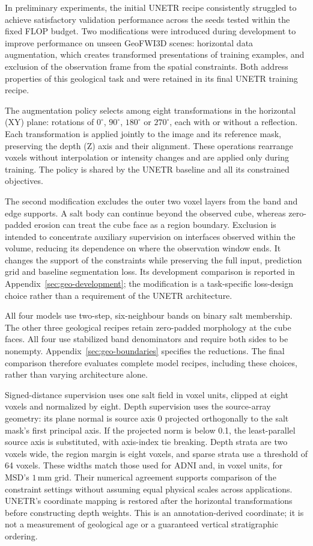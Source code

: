 \documentclass[12pt,a4paper]{article}
\begin{document}
In preliminary experiments, the initial UNETR recipe consistently struggled
to achieve satisfactory validation performance across the seeds tested
within the fixed FLOP budget. Two modifications were introduced during
development to improve performance on unseen GeoFWI3D scenes: horizontal
data augmentation, which creates transformed presentations of training
examples, and exclusion of the observation frame from the spatial
constraints. Both address properties of this geological task and were
retained in its final UNETR training recipe.

The augmentation policy selects among eight transformations in the
horizontal (XY) plane: rotations of $0^\circ$, $90^\circ$, $180^\circ$
or $270^\circ$, each with or without a reflection. Each transformation
is applied jointly to the image and its reference mask, preserving the
depth (Z) axis and their alignment. These operations rearrange voxels
without interpolation or intensity changes and are applied only during
training. The policy is shared by the UNETR baseline and all its
constrained objectives.

The second modification excludes the outer two voxel layers from the
band and edge supports. A salt body can continue beyond the observed
cube, whereas zero-padded erosion can treat the cube face as a region
boundary. Exclusion is intended to concentrate auxiliary supervision
on interfaces observed within the volume, reducing its dependence on
where the observation window ends. It changes the support of the
constraints while preserving the full input, prediction grid and
baseline segmentation loss. Its development comparison is reported in
Appendix~\ref{sec:geo-development}; the modification is a task-specific
loss-design choice rather than a requirement of the UNETR architecture.

All four models use two-step, six-neighbour bands on binary salt
membership. The other three geological recipes retain zero-padded
morphology at the cube faces. All four use stabilized band denominators
and require both sides to be nonempty.
Appendix~\ref{sec:geo-boundaries} specifies the reductions. The final
comparison therefore evaluates complete model recipes, including these
choices, rather than varying architecture alone.

Signed-distance supervision uses one salt field in voxel units, clipped
at eight voxels and normalized by eight. Depth supervision uses the
source-array geometry: its plane normal is source axis 0 projected
orthogonally to the salt mask's first principal axis. If the projected
norm is below 0.1, the least-parallel source axis is substituted, with
axis-index tie breaking. Depth strata are two voxels wide, the region
margin is eight voxels, and sparse strata use a threshold of 64 voxels.
These widths match those used for ADNI and, in voxel units, for MSD's
$1\,\mathrm{mm}$ grid. Their numerical agreement supports comparison of
the constraint settings without assuming equal physical scales across
applications.
UNETR's coordinate mapping is restored after the horizontal transformations before
constructing depth weights. This is an annotation-derived coordinate;
it is not a measurement of geological age or a guaranteed vertical
stratigraphic ordering.
\end{document}
